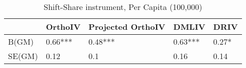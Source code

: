 \begin{table}\centering\caption{Shift-Share instrument, Per Capita (100,000)}\begin{tabular}{lllll}
\toprule
        & OrthoIV   & Projected OrthoIV   & DMLIV   & DRIV   \\
\midrule
 B(GM)  & 0.66***   & 0.48***             & 0.63*** & 0.27*  \\
 SE(GM) & 0.12      & 0.1                 & 0.16    & 0.14   \\
\bottomrule
\end{tabular}\end{table}